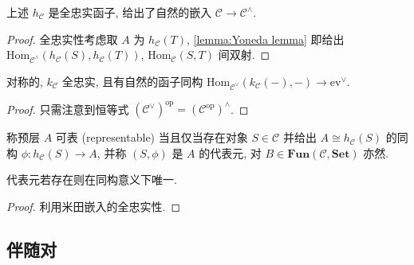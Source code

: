 \begin{lemma}
    上述 \(h_\mathcal{C}\) 是全忠实函子, 给出了自然的嵌入 \(\mathcal{C} \to \mathcal{C}^{\wedge}\).

    \begin{proof}
        全忠实性考虑取 \(A\) 为 \(h_\mathcal{C}(T)\), \ref{lemma:Yoneda lemma} 即给出 \(\mathrm{Hom}_{\mathcal{C}^{\wedge}} (h_{\mathcal{C}} (S), h_{\mathcal{C}} (T))\), \(\mathrm{Hom}_{\mathcal{C}} (S,T)\)
        间双射.
    \end{proof}
\end{lemma}

\begin{corollary}
    对称的, \(k_\mathcal{C}\) 全忠实, 且有自然的函子同构 \(\mathrm{Hom}_{\mathcal{C}^{\vee}} (k_{\mathcal{C}} (-), -) \to \mathrm{ev}^{\vee}\).

    \begin{proof}
        只需注意到恒等式 \({(\mathcal{C}^{\vee})}^\mathrm{op} = {(\mathcal{C}^{\mathrm{op}})}^{\wedge}\).
    \end{proof}
\end{corollary}

\begin{definition}[可表]
    称预层 \(A\) 可表 (representable) 当且仅当存在对象 \(S \in \mathcal{C}\) 并给出 \(A \cong h_{\mathcal{C}} (S)\) 的同构 \(\phi : h_{\mathcal{C}} (S) \to A\),
    并称 \((S,\phi)\) 是 \(A\) 的代表元, 对 \(B \in \mathbf{Fun} (\mathcal{C},\mathbf{Set})\) 亦然.
\end{definition}

\begin{lemma}
    代表元若存在则在同构意义下唯一.

    \begin{proof}
        利用米田嵌入的全忠实性.
    \end{proof}
\end{lemma}

\subsection{伴随对}

